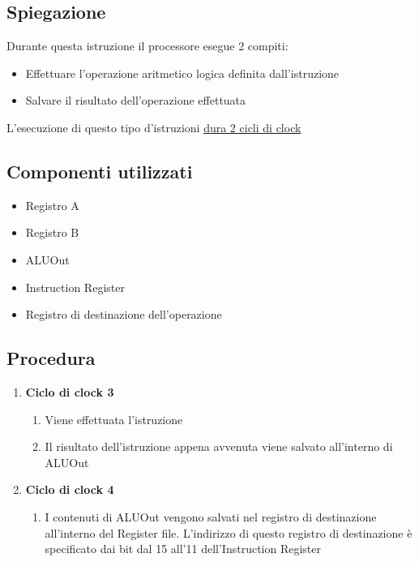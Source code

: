 \subsection{Spiegazione}
Durante questa istruzione il processore esegue 2 compiti:

\begin{itemize}
    \item Effettuare l'operazione aritmetico logica definita dall'istruzione
    \item Salvare il risultato dell'operazione effettuata
\end{itemize}

L'esecuzione di questo tipo d'istruzioni \uline{dura 2 cicli di clock}

\subsection{Componenti utilizzati}
\begin{itemize}
    \item Registro A
    \item Registro B
    \item ALUOut
    \item Instruction Register
    \item Registro di destinazione dell'operazione
\end{itemize}

\subsection{Procedura}
\begin{enumerate}
    \item[3.] \textbf{Ciclo di clock 3}
        \begin{enumerate}[label=\theenumi.\arabic*]
            \item [3.1] Viene effettuata l'istruzione 
            \item [3.2] Il risultato dell'istruzione appena avvenuta viene salvato all'interno di ALUOut
        \end{enumerate}
    \item [4.] \textbf{Ciclo di clock 4}
        \begin{enumerate}
            \item [4.1] I contenuti di ALUOut vengono salvati nel registro di destinazione all'interno del Register file. L'indirizzo di questo registro di destinazione è specificato dai bit dal 15 all'11 dell'Instruction Register
        \end{enumerate}
\end{enumerate}

